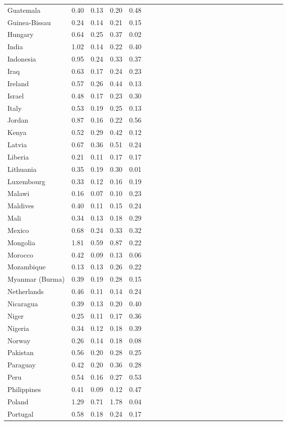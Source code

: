 \begin{ThreePartTable}
\begin{longtable}[t]{l|r|rrrl|r|rrrl|r|rrrl|r|rrrl|r|rrr}
Guatemala & 0.40 & 0.13 & 0.20 & 0.48\\
Guinea-Bissau & 0.24 & 0.14 & 0.21 & 0.15\\
Hungary & 0.64 & 0.25 & 0.37 & 0.02\\
India & 1.02 & 0.14 & 0.22 & 0.40\\
Indonesia & 0.95 & 0.24 & 0.33 & 0.37\\
Iraq & 0.63 & 0.17 & 0.24 & 0.23\\
Ireland & 0.57 & 0.26 & 0.44 & 0.13\\
Israel & 0.48 & 0.17 & 0.23 & 0.30\\
Italy & 0.53 & 0.19 & 0.25 & 0.13\\
Jordan & 0.87 & 0.16 & 0.22 & 0.56\\
Kenya & 0.52 & 0.29 & 0.42 & 0.12\\
Latvia & 0.67 & 0.36 & 0.51 & 0.24\\
Liberia & 0.21 & 0.11 & 0.17 & 0.17\\
Lithuania & 0.35 & 0.19 & 0.30 & 0.01\\
Luxembourg & 0.33 & 0.12 & 0.16 & 0.19\\
Malawi & 0.16 & 0.07 & 0.10 & 0.23\\
Maldives & 0.40 & 0.11 & 0.15 & 0.24\\
Mali & 0.34 & 0.13 & 0.18 & 0.29\\
Mexico & 0.68 & 0.24 & 0.33 & 0.32\\
Mongolia & 1.81 & 0.59 & 0.87 & 0.22\\
Morocco & 0.42 & 0.09 & 0.13 & 0.06\\
Mozambique & 0.13 & 0.13 & 0.26 & 0.22\\
Myanmar (Burma) & 0.39 & 0.19 & 0.28 & 0.15\\
Netherlands & 0.46 & 0.11 & 0.14 & 0.24\\
Nicaragua & 0.39 & 0.13 & 0.20 & 0.40\\
Niger & 0.25 & 0.11 & 0.17 & 0.36\\
Nigeria & 0.34 & 0.12 & 0.18 & 0.39\\
Norway & 0.26 & 0.14 & 0.18 & 0.08\\
Pakistan & 0.56 & 0.20 & 0.28 & 0.25\\
Paraguay & 0.42 & 0.20 & 0.36 & 0.28\\
Peru & 0.54 & 0.16 & 0.27 & 0.53\\
Philippines & 0.41 & 0.09 & 0.12 & 0.47\\
Poland & 1.29 & 0.71 & 1.78 & 0.04\\
Portugal & 0.58 & 0.18 & 0.24 & 0.17\\

\end{longtable}
\end{ThreePartTable}
